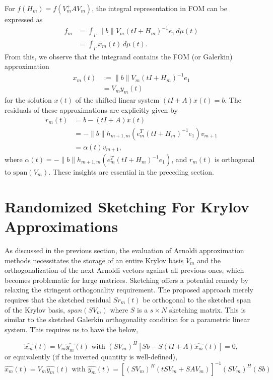 For $f(H_m) = f(V_m^+ A V_m)$, the integral representation in FOM can be expressed as
\begin{align}
    f_m &= \int_{\Gamma} \|b\| V_m (tI + H_m)^{-1} e_1 \, d\mu(t) \\
    &= \int_{\Gamma} x_m(t) \, d\mu(t).
    \label{eq:5.4&5.5}
\end{align}
From this, we observe that the integrand contains the FOM (or Galerkin) approximation
\begin{align*}
    x_m(t) &:= \|b\| V_m (tI + H_m)^{-1} e_1 \\
    &= V_m y_m(t)
\end{align*}
for the solution $x(t)$ of the shifted linear system $(tI + A)x(t) = b$. The residuals of these approximations are explicitly given by
\begin{align}
    r_m(t) &= b - (tI + A)x(t) \\
    &= -\|b\| h_{m+1,m} (e_m^{T}(tI + H_m)^{-1} e_1) v_{m+1} \\
    &= \alpha(t) v_{m+1},
    \label{eq:5.6&5.7&5.8}
\end{align}
where $\alpha(t) = -\|b\| h_{m+1,m} (e_m^{T}(tI + H_m)^{-1} e_1)$, and $r_m(t)$ is orthogonal to $\text{span}(V_m)$. These insights are essential in the preceding section.

\section{Randomized Sketching For Krylov Approximations}
\label{sec:sketching}

As discussed in the previous section, the evaluation of Arnoldi approximation methods necessitates the storage of an entire Krylov basis $V_m$ and the orthogonalization of the next Arnoldi vectors against all previous ones, which becomes problematic for large matrices. Sketching offers a potential remedy by relaxing the stringent orthogonality requirement. The proposed approach merely requires that the sketched residual $Sr_m(t)$ be orthogonal to the sketched span of the Krylov basis, $span(SV_m)$ where $S$ is a $s\times N$ sketching matrix. This is similar to the sketched Galerkin orthogonality condition for a parametric linear system\cite{46}. This requires us to have the below,

\[
    \hat{x_m}(t) = V_m \hat{y_m}(t) \text{    with    } (SV_m)^{H}[Sb - S(tI + A)\hat{x_m}(t)] = 0,
\]
or equivalently (if the inverted quantity is well-defined), 
\begin{equation}
    \hat{x_m}(t) = V_m\hat{y_m}(t) \text{    with    } \hat{y_m}(t) = [(SV_m)^{H}(tSV_m + SAV_m)]^{-1}(SV_m)^{H}(Sb)
    \label{eq:2.28}
\end{equation}

